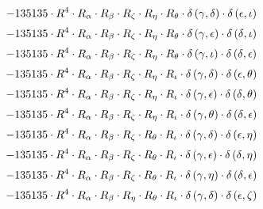 \begin{subequations}
\begin{gather}
 \\[0.2em] \notag 		 - 135135 \cdot R^{4} \cdot R_{\alpha{}} \cdot R_{\beta{}} \cdot R_{\zeta{}} \cdot R_{\eta{}} \cdot R_{\theta{}} \cdot \delta{}\left(\gamma{}, \delta{}\right) \cdot \delta{}\left(\epsilon{}, \iota{}\right) 
 \\[0.2em] \notag 		 - 135135 \cdot R^{4} \cdot R_{\alpha{}} \cdot R_{\beta{}} \cdot R_{\zeta{}} \cdot R_{\eta{}} \cdot R_{\theta{}} \cdot \delta{}\left(\gamma{}, \epsilon{}\right) \cdot \delta{}\left(\delta{}, \iota{}\right) 
 \\[0.2em] \notag 		 - 135135 \cdot R^{4} \cdot R_{\alpha{}} \cdot R_{\beta{}} \cdot R_{\zeta{}} \cdot R_{\eta{}} \cdot R_{\theta{}} \cdot \delta{}\left(\gamma{}, \iota{}\right) \cdot \delta{}\left(\delta{}, \epsilon{}\right) 
 \\[0.2em] \notag 		 - 135135 \cdot R^{4} \cdot R_{\alpha{}} \cdot R_{\beta{}} \cdot R_{\zeta{}} \cdot R_{\eta{}} \cdot R_{\iota{}} \cdot \delta{}\left(\gamma{}, \delta{}\right) \cdot \delta{}\left(\epsilon{}, \theta{}\right) 
 \\[0.2em] \notag 		 - 135135 \cdot R^{4} \cdot R_{\alpha{}} \cdot R_{\beta{}} \cdot R_{\zeta{}} \cdot R_{\eta{}} \cdot R_{\iota{}} \cdot \delta{}\left(\gamma{}, \epsilon{}\right) \cdot \delta{}\left(\delta{}, \theta{}\right) 
 \\[0.2em] \notag 		 - 135135 \cdot R^{4} \cdot R_{\alpha{}} \cdot R_{\beta{}} \cdot R_{\zeta{}} \cdot R_{\eta{}} \cdot R_{\iota{}} \cdot \delta{}\left(\gamma{}, \theta{}\right) \cdot \delta{}\left(\delta{}, \epsilon{}\right) 
 \\[0.2em] \notag 		 - 135135 \cdot R^{4} \cdot R_{\alpha{}} \cdot R_{\beta{}} \cdot R_{\zeta{}} \cdot R_{\theta{}} \cdot R_{\iota{}} \cdot \delta{}\left(\gamma{}, \delta{}\right) \cdot \delta{}\left(\epsilon{}, \eta{}\right) 
 \\[0.2em] \notag 		 - 135135 \cdot R^{4} \cdot R_{\alpha{}} \cdot R_{\beta{}} \cdot R_{\zeta{}} \cdot R_{\theta{}} \cdot R_{\iota{}} \cdot \delta{}\left(\gamma{}, \epsilon{}\right) \cdot \delta{}\left(\delta{}, \eta{}\right) 
 \\[0.2em] \notag 		 - 135135 \cdot R^{4} \cdot R_{\alpha{}} \cdot R_{\beta{}} \cdot R_{\zeta{}} \cdot R_{\theta{}} \cdot R_{\iota{}} \cdot \delta{}\left(\gamma{}, \eta{}\right) \cdot \delta{}\left(\delta{}, \epsilon{}\right) 
 \\[0.2em] \notag 		 - 135135 \cdot R^{4} \cdot R_{\alpha{}} \cdot R_{\beta{}} \cdot R_{\eta{}} \cdot R_{\theta{}} \cdot R_{\iota{}} \cdot \delta{}\left(\gamma{}, \delta{}\right) \cdot \delta{}\left(\epsilon{}, \zeta{}\right) 

\end{gather}
\end{subequations}
